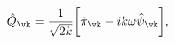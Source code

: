 \begin{equation}
\hat{Q}_{\vk} = \frac{1}{\sqrt{2 k}}\biggl[ \hat{\pi}_{\vk} - i k  \omega \hat{\psi}_{\vk}\biggr],
\label{Qpr}
\end{equation}

